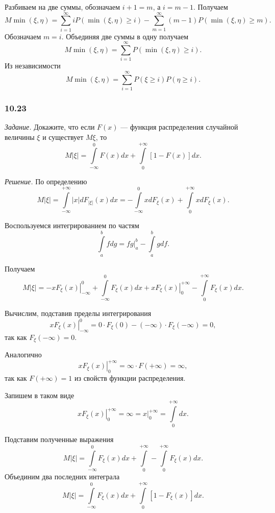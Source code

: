 Разбиваем на две суммы, обозначаем $i + 1 = m$, а $i = m - 1$.
Получаем
$$M \min \left( \xi, \eta \right) =
\sum \limits_{i=1}^{ \infty } iP \left( \min \left( \xi, \eta \right) \geq i \right) -
\sum \limits_{m=1}^{ \infty } \left( m-1 \right) P \left( \min \left( \xi, \eta \right) \geq m \right).$$
Обозначаем $m = i$.
Объединяя две суммы в одну получаем
$$M \min \left( \xi, \eta \right) =
\sum \limits_{i=1}^{ \infty } P \left( \min \left( \xi, \eta \right) \geq i \right).$$
Из независимости
$$M \min \left( \xi, \eta \right) =
\sum \limits_{i=1}^{ \infty } P \left( \xi \geq i \right) P \left( \eta \geq i \right).$$

\subsubsection*{10.23}

\textit{Задание.} Докажите, что если $F \left( x \right) $ --- функция распределения случайной величины $ \xi $ и существует $M \xi $, то
$$M \left| \xi \right| =
\int \limits_{- \infty }^0 F \left( x \right) dx + \int \limits_0^{+ \infty } \left[ 1 - F \left( x \right) \right] dx.$$

\textit{Решение.} По определению
$$M \left| \xi \right| =
\int \limits_{- \infty }^{+ \infty } \left| x \right| dF_{ \left| \xi \right| } \left( x \right) dx =
- \int \limits_{- \infty }^0 xdF_{ \xi } \left( x \right) + \int \limits_0^{+ \infty } xdF_{ \xi } \left( x \right).$$

Воспользуемся интегрированием по частям
$$ \int \limits_a^b fdg =
\left. fg \right|_a^b - \int \limits_a^b gdf.$$

Получаем
$$M \left| \xi \right| =
\left. -xF_{ \xi } \left( x \right) \right|_{- \infty }^0 + \int \limits_{- \infty }^0 F_{ \xi } \left( x \right) dx +
\left. xF_{ \xi } \left( x \right) \right|_0^{+ \infty } - \int \limits_0^{+ \infty } F_{ \xi } \left( x \right) dx.$$

Вычислим, подставив пределы интегрирования
$$ \left. xF_{ \xi } \left( x \right) \right|_{- \infty }^0 =
0 \cdot F_{ \xi } \left( 0 \right) - \left( - \infty \right) \cdot F_{ \xi } \left( - \infty \right) = 0,$$
так как $F_{ \xi } \left( - \infty \right) = 0$.

Аналогично
$$ \left. xF_{ \xi } \left( x \right) \right|_0^{+ \infty } = \infty \cdot F \left( + \infty \right) = \infty,$$
так как $F \left( + \infty \right) = 1$ из свойств функции распределения.

Запишем в таком виде
$$ \left. xF_{ \xi } \left( x \right) \right|_0^{+ \infty } =
\infty =
\left. x \right|_0^{+ \infty } =
\int \limits_0^{+ \infty } dx.$$

Подставим полученные выражения
$$M \left| \xi \right| =
\int \limits_{- \infty }^0 F_{ \xi } \left( x \right) dx + \int \limits_0^{+ \infty } -
\int \limits_0^{+ \infty } F_{ \xi } \left( x \right) dx.$$
Объединим два последних интеграла
$$M \left| \xi \right| =
\int \limits_{- \infty }^0 F_{ \xi } \left( x \right) dx + \int \limits_0^{+ \infty } \left[ 1 - F_{ \xi } \left( x \right) \right] dx.$$
